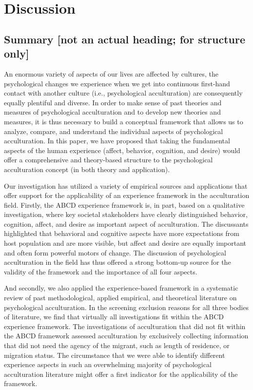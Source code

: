 \documentclass[man, 12pt, a4paper]{apa7}
\begin{document}


\section{Discussion}

\subsection{Summary [not an actual heading; for structure only]}
An enormous variety of aspects of our lives are affected by cultures, the psychological changes we experience when we get into continuous first-hand contact with another culture (i.e., psychological acculturation) are consequently equally plentiful and diverse.
In order to make sense of past theories and measures of psychological acculturation and to develop new theories and measures, it is thus necessary to build a conceptual framework that allows us to analyze, compare, and understand the individual aspects of psychological acculturation.
In this paper, we have proposed that taking the fundamental aspects of the human experience (affect, behavior, cognition, and desire) would offer a comprehensive and theory-based structure to the psychological acculturation concept (in both theory and application).

Our investigation has utilized a variety of empirical sources and applications that offer support for the applicability of an experience framework in the acculturation field. Firstly, the ABCD experience framework is, in part, based on a qualitative investigation, where key societal stakeholders have clearly distinguished behavior, cognition, affect, and desire as important aspect of acculturation. The discussants highlighted that behavioral and cognitive aspects have more expectations from host population and are more visible, but affect and desire are equally important and often form powerful motors of change. The discussion of psychological acculturation in the field has thus offered a strong bottom-up source for the validity of the framework and the importance of all four aspects.

And secondly, we also applied the experience-based framework in a systematic review of past methodological, applied empirical, and theoretical literature on psychological acculturation. In the screening exclusion reasons for all three bodies of literature, we find that virtually all investigations fit within the ABCD experience framework. The investigations of acculturation that did not fit within the ABCD framework assessed acculturation by exclusively collecting information that did not need the agency of the migrant, such as length of residence, or migration status. The circumstance that we were able to identify different experience aspects in such an overwhelming majority of psychological acculturation literature might offer a first indicator for the applicability of the framework.
\end{document}

